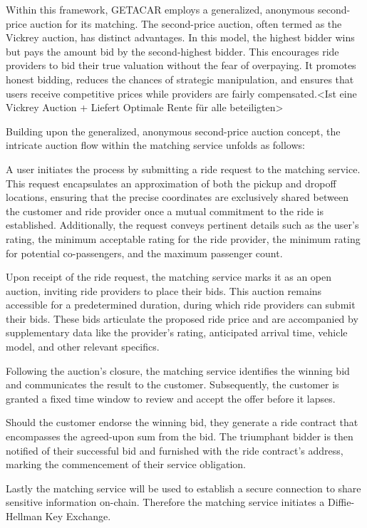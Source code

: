 Within this framework, GETACAR employs a generalized, anonymous second-price auction for its matching. The second-price auction, often termed as the Vickrey auction, has distinct advantages. In this model, the highest bidder wins but pays the amount bid by the second-highest bidder. This encourages ride providers to bid their true valuation without the fear of overpaying. It promotes honest bidding, reduces the chances of strategic manipulation, and ensures that users receive competitive prices while providers are fairly compensated.<Ist eine Vickrey Auction + Liefert Optimale Rente für alle beteiligten>


Building upon the generalized, anonymous second-price auction concept, the intricate auction flow within the matching service unfolds as follows:

A user initiates the process by submitting a ride request to the matching service. This request encapsulates an approximation of both the pickup and dropoff locations, ensuring that the precise coordinates are exclusively shared between the customer and ride provider once a mutual commitment to the ride is established. Additionally, the request conveys pertinent details such as the user's rating, the minimum acceptable rating for the ride provider, the minimum rating for potential co-passengers, and the maximum passenger count.

Upon receipt of the ride request, the matching service marks it as an open auction, inviting ride providers to place their bids. This auction remains accessible for a predetermined duration, during which ride providers can submit their bids. These bids articulate the proposed ride price and are accompanied by supplementary data like the provider's rating, anticipated arrival time, vehicle model, and other relevant specifics.

Following the auction's closure, the matching service identifies the winning bid and communicates the result to the customer. Subsequently, the customer is granted a fixed time window to review and accept the offer before it lapses.

Should the customer endorse the winning bid, they generate a ride contract that encompasses the agreed-upon sum from the bid. The triumphant bidder is then notified of their successful bid and furnished with the ride contract's address, marking the commencement of their service obligation.

Lastly the matching service will be used to establish a secure connection to share sensitive information on-chain. Therefore the matching service initiates a Diffie-Hellman Key Exchange.

